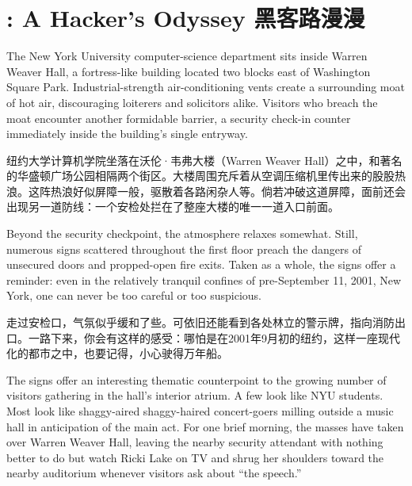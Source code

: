\chapter{\ifdefined{}: A Hacker's Odyssey
\fi
\ifdefined\chs
黑客路漫漫
\fi}
\thispagestyle{empty}
\ifdefined\eng
The New York University computer-science department sits inside Warren Weaver Hall, a fortress-like building located two blocks east of Washington Square Park. Industrial-strength air-conditioning vents create a surrounding moat of hot air, discouraging loiterers and solicitors alike. Visitors who breach the moat encounter another formidable barrier, a security check-in counter immediately inside the building's single entryway.
\fi

\ifdefined\chs
纽约大学计算机学院坐落在沃伦·韦弗大楼（Warren Weaver Hall）之中，和著名的华盛顿广场公园相隔两个街区。大楼周围充斥着从空调压缩机里传出来的股股热浪。这阵热浪好似屏障一般，驱散着各路闲杂人等。倘若冲破这道屏障，面前还会出现另一道防线：一个安检处拦在了整座大楼的唯一一道入口前面。
\fi

\ifdefined\eng
Beyond the security checkpoint, the atmosphere relaxes somewhat. Still, numerous signs scattered throughout the first floor preach the dangers of unsecured doors and propped-open fire exits. Taken as a whole, the signs offer a reminder: even in the relatively tranquil confines of pre-September 11, 2001, New York, one can never be too careful or too suspicious.
\fi

\ifdefined\chs
走过安检口，气氛似乎缓和了些。可依旧还能看到各处林立的警示牌，指向消防出口。一路下来，你会有这样的感受：哪怕是在2001年9月初的纽约，这样一座现代化的都市之中，也要记得，小心驶得万年船。
\fi

\ifdefined\eng
The signs offer an interesting thematic counterpoint to the growing number of visitors gathering in the hall's interior atrium. A few look like NYU students. Most look like \ifdefined\vone shaggy-aired \fi\ifdefined\vtwo shaggy-haired \fi concert-goers milling outside a music hall in anticipation of the main act. For one brief morning, the masses have taken over Warren Weaver Hall, leaving the nearby security attendant with nothing better to do but watch Ricki Lake on TV and shrug her shoulders toward the nearby auditorium whenever visitors ask about ``the speech.''
\fi

